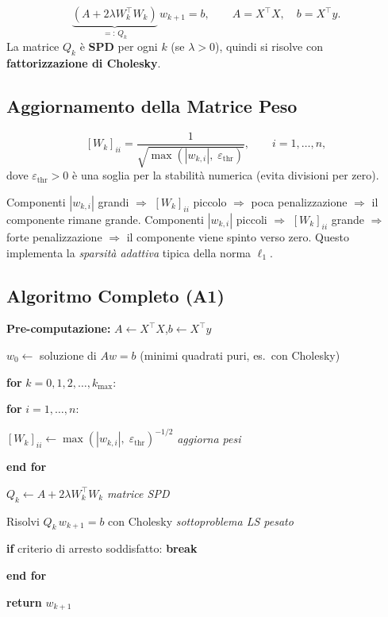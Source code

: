 \documentclass[11pt,a4paper]{article}
\theoremstyle{definition}
\theoremstyle{plain}
\theoremstyle{remark}
\newenvironment{pseudocode}{%
  \begin{list}{}{%
    \setlength{\leftmargin}{1.5em}%
    \setlength{\itemsep}{2pt}%
    \setlength{\parsep}{0pt}%
    \setlength{\topsep}{4pt}%
  }%
}{%
  \end{list}%
}
\newcommand{\pcline}[1]{\item[] #1}
\newcommand{\pcindent}{\hspace{1.5em}}
\newcommand{\pcindentII}{\hspace{3em}}
\newcommand{\T}{^{\top}}
\begin{document}
\begin{keybox}
  \[
    \underbrace{(A + 2\lambda W_k\T W_k)}_{=:\, Q_k}\, w_{k+1} = b,
    \qquad A = X\T X,\quad b = X\T y.
  \]
  La matrice $Q_k$ è \textbf{SPD} per ogni $k$ (se $\lambda > 0$), quindi si risolve con
  \textbf{fattorizzazione di Cholesky}.
\end{keybox}

\subsection{Aggiornamento della Matrice Peso}

\[
  [W_k]_{ii} = \frac{1}{\sqrt{\max(|w_{k,i}|,\;\varepsilon_{\text{thr}})}}, \qquad i = 1, \ldots, n,
\]
dove $\varepsilon_{\text{thr}} > 0$ è una soglia per la stabilità numerica (evita divisioni per zero).

\begin{intubox}
  Componenti $|w_{k,i}|$ grandi $\Rightarrow$ $[W_k]_{ii}$ piccolo $\Rightarrow$ poca penalizzazione
  $\Rightarrow$ il componente rimane grande.
  Componenti $|w_{k,i}|$ piccoli $\Rightarrow$ $[W_k]_{ii}$ grande $\Rightarrow$ forte penalizzazione
  $\Rightarrow$ il componente viene spinto verso zero.
  Questo implementa la \emph{sparsità adattiva} tipica della norma $\ell_1$.
\end{intubox}

\subsection{Algoritmo Completo (A1)}

\begin{algobox}
  \textbf{Pre-computazione:} $A \leftarrow X\T X$,\quad $b \leftarrow X\T y$
  \vspace{0.5em}
  \begin{pseudocode}
    \pcline{$w_0 \leftarrow$ soluzione di $Aw = b$ (minimi quadrati puri, es.\ con Cholesky)}
    \pcline{\textbf{for} $k = 0, 1, 2, \ldots, k_{\max}$:}
    \pcline{\pcindent \textbf{for} $i = 1, \ldots, n$:}
    \pcline{\pcindentII $[W_k]_{ii} \leftarrow \max(|w_{k,i}|,\;\varepsilon_{\text{thr}})^{-1/2}$
      \hfill \textit{aggiorna pesi}}
    \pcline{\pcindent \textbf{end for}}
    \pcline{\pcindent $Q_k \leftarrow A + 2\lambda W_k\T W_k$
      \hfill \textit{matrice SPD}}
    \pcline{\pcindent Risolvi $Q_k\, w_{k+1} = b$ con Cholesky
      \hfill \textit{sottoproblema LS pesato}}
    \pcline{\pcindent \textbf{if} criterio di arresto soddisfatto: \textbf{break}}
    \pcline{\textbf{end for}}
    \pcline{\textbf{return} $w_{k+1}$}
  \end{pseudocode}
\end{algobox}
\end{document}
